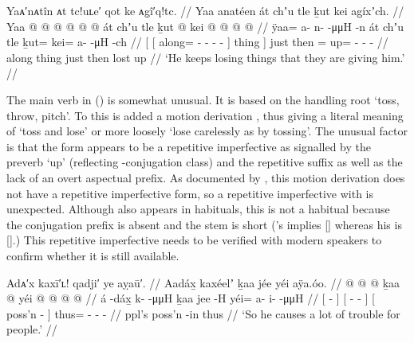 \ex\label{ex:106-33-loses-things}%
%
\begingl
	\glpreamble	Yaᴀ′nᴀtîn ᴀt tc!uʟe′ qot ke ᴀg̣î′q!tc. //
	\glpreamble	Yaa anatéen át chʼu tle ḵut kei ag̱íxʼch. //
	\gla	{} {} Yaa @  @ {} @ {} @ {} @ {} @ {} {} át {}
			chʼu tle ḵut @ kei @  @ {} @ {} @ {} //
	\glb	{} {} ÿaa= a- n-  -μμH -n {} {} át {}
			chʼu tle ḵut= kei= a-  -μH -ch //
	\glc	{}[ {}[ along= - -  - - \· {}] thing {}]
			just then = up= -  - - //
	\gld	{} {} along  {} {} {} {} {} {} thing {}
			just then lost up  {} {} {} //
	\glft	‘He keeps losing things that they are giving him.’
		//
\endgl
\xe

The main verb  in (\lastx) is somewhat unusual.
It is based on the handling root  ‘toss, throw, pitch’.
To this is added a motion derivation , thus giving a literal meaning of ‘toss and lose’ or more loosely ‘lose carelessly as by tossing’.
The unusual factor is that the form  appears to be a repetitive imperfective as signalled by the preverb  ‘up’ (reflecting -conjugation class) and the repetitive suffix  as well as the lack of an overt aspectual prefix.
As documented by \textcite[220]{leer:1991}, this motion derivation does not have a repetitive imperfective form, so a repetitive imperfective with  is unexpected.
Although  also appears in habituals, this is not a habitual because the  conjugation prefix is absent and the stem is short (\citeauthor{swanton:1909}’s  implies [] whereas his  is [].) This repetitive imperfective needs to be verified with modern speakers to confirm whether it is still available.

\ex\label{ex:106-34-cause-trouble}%
%
\begingl
	\glpreamble	Adᴀ′x kaxī′ʟ! qadji′ ye aỵaū′. //
	\glpreamble	Aadáx̱ kaxéelʼ ḵaa jée yéi aÿa.óo. //
	\gla	{}  @ {} {}
		{}  @ {} @ {} {}
		{} ḵaa  @ {} {}
		yéi @  @ {} @ {} @ {} //
	\glb	{} á -dáx̱ {}
		{} k-  -μμH {}
		{} ḵaa jee -H {}
		yéi= a- i-  -μμH //
	\glc	{}[  - {}]
		{}[ -  - {}]
		{}[  poss’n - {}]
		thus= - -  - //
	\gld	{}  {} {}
		{}  {} {} {}
		{} ppl’s poss’n -in {}
		thus  {} {} {} //
	\glft	‘So he causes a lot of trouble for people.’
		//
\endgl
\xe

